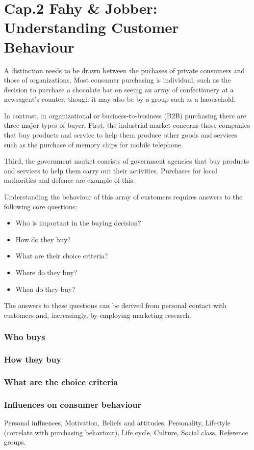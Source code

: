 \documentclass{article}
\begin{document}
\section{Cap.2 Fahy \& Jobber: Understanding Customer Behaviour}
A distinction needs to be drawn between the puchases of private consumers and those of organizations. Most consumer purchasing is individual, such as the decision to purchase a chocolate bar on seeing an array of confectionery at a newsagent's counter, though it may also be by a group such as a haousehold. 

In contrast, in organizational or business-to-business (B2B) purchasing there are three major types of buyer. First, the industrial market concerns those companies that buy products and service to help them produce other goods and services such as the purchase of memory chips for mobile telephone. 

Third, the government market consists of government agencies that buy products and services to help them carry out their activities. Purchases for local authorities and defence are example of this.

Understanding the behaviour of this array of customers requires answers to the following core questions:

\begin{itemize}
    \item Who is important in the buying decision?
    \item How do they buy?
    \item What are their choice criteria?
    \item Where do they buy?
    \item When do they buy?
\end{itemize}

The answers to these questions can be derived from personal contact with customers and, increasingly, by employing marketing research.

\subsubsection{Who buys}
\subsubsection{How they buy}
\subsubsection*{What are the choice criteria}
\subsubsection*{Influences on consumer behaviour}
Personal influences, Motivation, Beliefs and attitudes, Personality, Lifestyle (correlate with purchasing behaviour), Life cycle, Culture, Social class, Reference groups.
\end{document}
